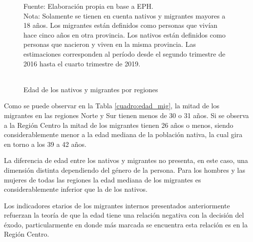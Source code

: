 \documentclass[12pt,a4paper]{article}
\begin{document}
\begin{figure}[ht!]
\begin{center}
\caption{\\Edad de los nativos y migrantes por regiones}
 
\label{figure:edad_mig}
\begin{flushleft}
\begin{scriptsize}
Fuente: Elaboración propia en base a EPH.\\
Nota: Solamente se tienen en cuenta nativos y migrantes mayores a 18 años. Los migrantes están definidos como personas que vivían hace cinco años en otra provincia. Los nativos están definidos como personas que nacieron y viven en la misma provincia. Las estimaciones corresponden al período desde el segundo trimestre de 2016 hasta el cuarto trimestre de 2019.\\
\end{scriptsize}
\end{flushleft}
\end{center}
\end{figure}

\newpage
Como se puede observar en la Tabla \ref{cuadro:edad_mig}, la mitad de los migrantes en las regiones Norte y Sur tienen menos de 30 o 31 años. Si se observa a la Región Centro la mitad de los migrantes tienen 26 años o menos, siendo considerablemente menor a la edad mediana de la población nativa, la cual gira en torno a los 39 a 42 años.

La diferencia de edad entre los nativos y migrantes no presenta, en este caso, una dimensión distinta dependiendo del género de la persona. Para los hombres y las mujeres de todas las regiones la edad mediana de los migrantes es considerablemente inferior que la de los nativos. 

Los indicadores etarios de los migrantes internos presentados anteriormente refuerzan la teoría de que la edad tiene una relación negativa con la decisión del éxodo, particularmente en donde más marcada se encuentra esta relación es en la Región Centro.
\end{document}
